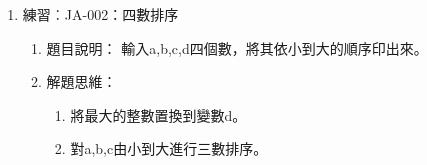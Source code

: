 \begin{enumerate}
\begin{enumerate}
			\item 解題思維：
			\begin{enumerate}
			\item 先宣告三整數 a, b, c並輸入其值。
			\begin{inside}
			int a, b, c;
			cin >> a >> b >> c;
			\end{inside}
			\item 三數排序時，先比a和b，如果a>b則交換兩個數，使a<b，之後再比b和c，使b<c，此時c為最大值。最後再比較和調整一次a和b即可。
			\begin{inside}
			if (a>b) swap(a, b);
			if (b>c) swap(b, c);
			if (a>b) swap(a, b);
			\end{inside}
			\item 交換兩數x和y，在\cc{}中可以直接使用swap函數，如果是在C裡面，則常用的方法是宣告另一個暫存變數t，然後使用以下敘述：
			\begin{inside}
			t=a; a=b; b=t;
			\end{inside}
			\end{enumerate} 
			
			\item 程式碼：
			\begin{cppcode}
				#include <iostream>
				using namespace std;
				
				int main()
				{
					int a, b, c;
					cin >> a >> b >> c;
					if (a>b) swap(a, b);
					if (b>c) swap(b, c);
					if (a>b) swap(a, b);
					cout << a << " " << b << " " << c;
					return 0;
				}
			\end{cppcode}
		\end{enumerate}
	\item 練習︰JA-002：四數排序
		\begin{enumerate}
			\item 題目說明：
			\subitem 輸入a,b,c,d四個數，將其依小到大的順序印出來。
			
			\item 解題思維：
			\begin{enumerate}
				\item 將最大的整數置換到變數d。
				\item 對a,b,c由小到大進行三數排序。
			\end{enumerate}
\begin{comment}			
			
			\item 程式碼：
			\begin{cppcode}
				#include <iostream>
				
				using namespace std;
				
				int main()
				{
					int a, b, c, d;
					cin >> a >> b >> c >> d;
					if (a>b) swap(a, b);
					if (b>c) swap(b, c);
					if (c>d) swap(c, d);
					if (a>b) swap(a, b);
					if (b>c) swap(b, c);
					if (a>b) swap(a, b);
					cout << a << " " << b << " " << c << " " << d;
					return 0;
				}
				
			\end{cppcode}
\end{comment}			
		\end{enumerate}
	
\end{enumerate}
		
